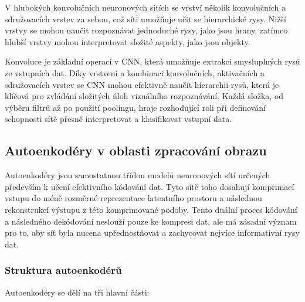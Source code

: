 \documentclass[male,czech,api_ing]{thesis}
\begin{document}
V hlubokých konvolučních neuronových sítích se vrství několik konvolučních a sdružovacích vrstev za sebou, což síti umožňuje učit se hierarchické rysy. Nižší vrstvy se mohou naučit rozpoznávat jednoduché rysy, jako jsou hrany, zatímco hlubší vrstvy mohou interpretovat složité aspekty, jako jsou objekty.

Konvoluce je základní operací v CNN, která umožňuje extrakci smysluplných rysů ze vstupních dat. Díky vrstvení a kombinaci konvolučních, aktivačních a sdružovacích vrstev se CNN mohou efektivně naučit hierarchii rysů, která je klíčová pro zvládání složitých úloh vizuálního rozpoznávání. Každá složka, od výběru filtrů až po použití poolingu, hraje rozhodující roli při definování schopnosti sítě přesně interpretovat a klasifikovat vstupní data. \cite{CNNConcepts, CNNConcepts2}

\subsection{Autoenkodéry v oblasti zpracování obrazu}
Autoenkodéry jsou samostatnou třídou modelů neuronových sítí určených především k učení efektivního kódování dat. Tyto sítě toho dosahují komprimací vstupu do méně rozměrné reprezentace latentního prostoru a následnou rekonstrukcí výstupu z této komprimované podoby. Tento duální proces kódování a následného dekódování neslouží pouze ke kompresi dat, ale má zásadní význam pro to, aby síť byla nucena upřednostňovat a zachycovat nejvíce informativní rysy dat.

\subsubsection{Struktura autoenkodérů}
Autoenkodéry se dělí na tři hlavní části:
\end{document}
